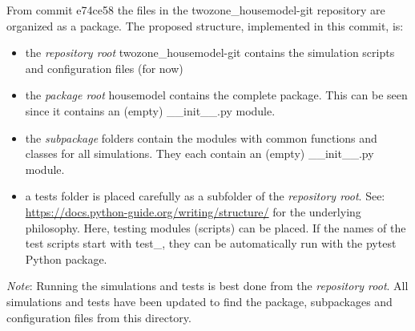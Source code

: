 From commit \textsf{e74ce58} the files in the \textsf{twozone\_housemodel-git} repository are organized as a package. The proposed structure, implemented in this commit, is:


\begin{itemize}
	\item the \emph{repository root} \textsf{twozone\_housemodel-git} contains the simulation scripts and configuration files (for now) 
	\item the \emph{package root} \textsf{housemodel} contains the complete package. This can be seen since it contains an (empty) \textsf{\_\_init\_\_.py} module.
	\item the \emph{subpackage} folders contain the modules with common functions and classes for all simulations. They each contain an (empty) \textsf{\_\_init\_\_.py} module.
	\item a \textsf{tests} folder is placed carefully as a subfolder of the \emph{repository root}. 
	See: \url{https://docs.python-guide.org/writing/structure/} for the underlying philosophy. Here, testing modules (scripts) can be placed. If the names of the test scripts start with \textsf{test\_}, they can be automatically run with the \textsf{pytest} Python package.
\end{itemize}

\textit{Note}: Running the simulations and tests is best done from the \emph{repository root}. All simulations and tests have been updated to find the package, subpackages and configuration files from this directory.

\newpage